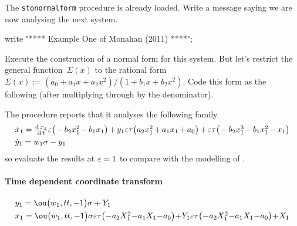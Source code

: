 The \verb|stonormalform| procedure is already loaded.
Write a message saying we are now analysing the next system.
\begin{reduce}
write "**** Example One of Monahan (2011) ****";
\end{reduce}

Execute the construction of a normal form for this system.  
But let's restrict the general function~\(\Sigma(x)\) to the rational form $\Sigma(x):=(a_0+a_1x+a_2x^2)/(1+b_1x+b_2x^2)$. Code this form as the following (after multiplying through by the denominator).

The procedure reports that it analyses the following family 
\begin{align*}&
\dot x_{1}=\ParMath{ \frac{{\rm d}\,x_{1}}{{\rm d}\,t} \eps \big(-b_{2} x_{1}^{2}-
b_{1} x_{1}\big)+y_{1} \eps \tau  \big(a_{2} x_{1}^{2}+a_{1} x_{1}+a_{0}
\big)+\eps \tau  \big(-b_{2} x_{1}^{3}-b_{1} x_{1}^{2}-x_{1}\big)
}
\\&
\dot y_{1}=w_{1} \sigma -y_{1}
\end{align*}
so evaluate the results at \(\varepsilon=1\) to compare with the modelling of \cite{Monahan2011}.

\paragraph{Time dependent coordinate transform}
\begin{align*}&
y_{1}=\ou\big(w_{1},tt,-1\big) \sigma +Y_{1}
\\&
x_{1}=\ParMath{\ou\big(w_{1},tt,-1\big) \sigma  \eps \tau  \big(-a_{2} X_{1}^{2}-
a_{1} X_{1}-a_{0}\big)+Y_{1} \eps \tau  \big(-a_{2} X_{1}^{2}-a_{1} X_{1
}-a_{0}\big)+X_{1}
}
\end{align*}


